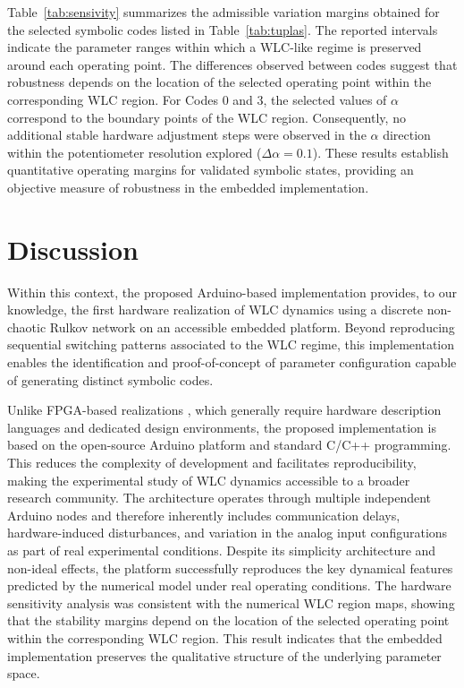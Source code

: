 \documentclass[lettersize,journal]{IEEEtran}
\begin{document}
Table~\ref{tab:sensivity} summarizes the admissible variation margins obtained for the selected symbolic codes listed in Table~\ref{tab:tuplas}. The reported intervals indicate the parameter ranges within which a WLC-like regime is preserved around each operating point. The differences observed between codes suggest that robustness depends on the location of the selected operating point within the corresponding WLC region. For Codes 0 and 3, the selected values of $\alpha$ correspond to the boundary points of the WLC region. Consequently, no additional stable hardware adjustment steps were observed in the $\alpha$ direction within the potentiometer resolution explored ($\Delta\alpha=0.1$).
These results establish quantitative operating margins for validated symbolic states, providing an objective measure of robustness in the embedded implementation.

\section{Discussion}
Within this context, the proposed Arduino-based implementation provides, to our knowledge, the first hardware realization of WLC dynamics using a discrete non-chaotic Rulkov network on an accessible embedded platform. Beyond reproducing sequential switching patterns associated to the WLC regime, this implementation enables the identification and proof-of-concept of parameter configuration capable of generating distinct symbolic codes.

Unlike FPGA-based realizations \cite{caluwaerts2013tensegripede}, which generally require hardware description languages and dedicated design environments, the proposed implementation is based on the open-source Arduino platform and standard C/C++ programming. This reduces the complexity of development and facilitates reproducibility, making the experimental study of WLC dynamics accessible to a broader research community. The architecture operates through multiple independent Arduino nodes and therefore inherently includes communication delays, hardware-induced disturbances, and variation in the analog input configurations as part of real experimental conditions. Despite its simplicity architecture and non-ideal effects, the platform successfully reproduces the key dynamical features predicted by the numerical model under real operating conditions.
The hardware sensitivity analysis was consistent with the numerical WLC region maps, showing that the stability margins depend on the location of the selected operating point within the corresponding WLC region. This result indicates that the embedded implementation preserves the qualitative structure of the underlying parameter space.
\end{document}
